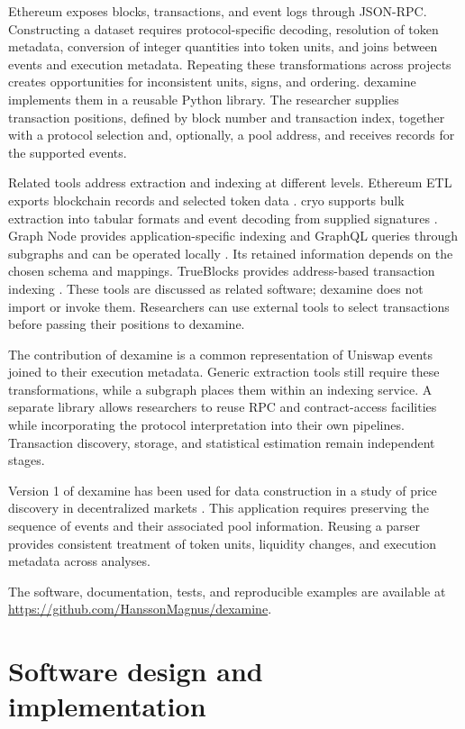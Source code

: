 \documentclass[11pt]{article}
\begin{document}
Ethereum exposes blocks, transactions, and event logs through JSON-RPC. Constructing
a dataset requires protocol-specific decoding, resolution of token metadata, conversion
of integer quantities into token units, and joins between events and execution
metadata. Repeating these transformations across projects creates opportunities for
inconsistent units, signs, and ordering. dexamine implements them in a reusable Python
library.
The researcher supplies transaction positions, defined by block number and transaction
index, together with a protocol selection and, optionally, a pool address, and receives records for the supported events.

Related tools address extraction and indexing at different levels. Ethereum ETL exports
blockchain records and selected token data \cite{ethereumetl}. cryo supports bulk
extraction into tabular formats and event decoding from supplied signatures
\cite{cryo2023}. Graph Node provides application-specific indexing and GraphQL queries
through subgraphs and can be operated locally \cite{graphnode}. Its retained information
depends on the chosen schema and mappings. TrueBlocks provides address-based transaction
indexing \cite{trueblocks}. These tools are discussed as related software; dexamine
does not import or invoke them. Researchers can use external tools to select
transactions before passing their positions to dexamine.

The contribution of dexamine is a common representation of Uniswap events joined to
their execution metadata. Generic extraction tools still require these transformations,
while a subgraph places them within an indexing service. A separate library allows
researchers to reuse RPC and contract-access facilities while incorporating the
protocol interpretation into their own pipelines. Transaction discovery, storage,
and statistical estimation remain independent stages.

Version 1 of dexamine has been used for
data construction in a study of price discovery in decentralized markets \cite{hansson2024}.
This application requires preserving the sequence of events and their associated
pool information. Reusing a parser provides consistent treatment of token units,
liquidity changes, and execution metadata across analyses.

The software, documentation, tests, and reproducible examples are available at
\url{https://github.com/HanssonMagnus/dexamine}.

\section{Software design and implementation}
\end{document}

